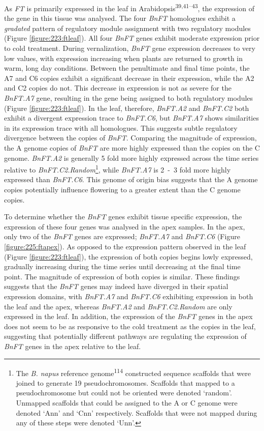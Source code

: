 \documentclass[12pt,]{book}
\begin{document}
As \emph{FT} is primarily expressed in the leaf in
Arabidopsis\textsuperscript{39,41--43}, the expression of the gene in
this tissue was analysed. The four \emph{BnFT} homologues exhibit a
\emph{gradated} pattern of regulatory module assignment with two
regulatory modules (Figure \ref{figure:223:ftleaf}). All four
\emph{BnFT} genes exhibit moderate expression prior to cold treatment.
During vernalization, \emph{BnFT} gene expression decreases to very low
values, with expression increasing when plants are returned to growth in
warm, long day conditions. Between the penultimate and final time
points, the A7 and C6 copies exhibit a significant decrease in their
expression, while the A2 and C2 copies do not. This decrease in
expression is not as severe for the \emph{BnFT.A7} gene, resulting in
the gene being assigned to both regulatory modules (Figure
\ref{figure:223:ftleaf}). In the leaf, therefore, \emph{BnFT.A2} and
\emph{BnFT.C2} both exhibit a divergent expression trace to
\emph{BnFT.C6}, but \emph{BnFT.A7} shows similarities in its expression
trace with all homologues. This suggests subtle regulatory divergence
between the copies of \emph{BnFT}. Comparing the magnitude of
expression, the A genome copies of \emph{BnFT} are more highly expressed
than the copies on the C genome. \emph{BnFT.A2} is generally 5 fold more
highly expressed across the time series relative to
\emph{BnFT.C2.Random}\footnote{The \emph{B. napus} reference
  genome\textsuperscript{114} constructed sequence scaffolds that were
  joined to generate 19 pseudochromosomes. Scaffolds that mapped to a
  pseudochromosome but could not be oriented were denoted `random'.
  Unmapped scaffolds that could be assigned to the A or C genome were
  denoted `Ann' and `Cnn' respectively. Scaffolds that were not mapped
  during any of these steps were denoted `Unn'.}, while \emph{BnFT.A7}
is 2~-~3 fold more highly expressed than \emph{BnFT.C6}. This genome of
origin bias suggests that the A genome copies potentially influence
flowering to a greater extent than the C genome copies.

To determine whether the \emph{BnFT} genes exhibit tissue specific
expression, the expression of these four genes was analysed in the apex
samples. In the apex, only two of the \emph{BnFT} genes are expressed;
\emph{BnFT.A7} and \emph{BnFT.C6} (Figure \ref{figure:225:ftapex}). As
opposed to the expression pattern observed in the leaf (Figure
\ref{figure:223:ftleaf}), the expression of both copies begins lowly
expressed, gradually increasing during the time series until decreasing
at the final time point. The magnitude of expression of both copies is
similar. These findings suggests that the \emph{BnFT} genes may indeed
have diverged in their spatial expression domains, with \emph{BnFT.A7}
and \emph{BnFT.C6} exhibiting expression in both the leaf and the apex,
whereas \emph{BnFT.A2} and \emph{BnFT.C2.Random} are only expressed in
the leaf. In addition, the expression of the \emph{BnFT} genes in the
apex does not seem to be as responsive to the cold treatment as the
copies in the leaf, suggesting that potentially different pathways are
regulating the expression of \emph{BnFT} genes in the apex relative to
the leaf.
\end{document}
